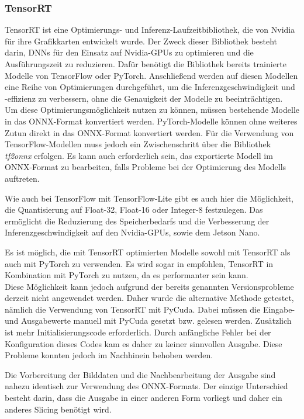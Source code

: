 \subsubsection{TensorRT} \label{cap:tensorrt}

TensorRT ist eine Optimierungs- und Inferenz-Laufzeitbibliothek, die von Nvidia für ihre Grafikkarten entwickelt wurde. Der Zweck dieser Bibliothek besteht darin, \ac{DNN}s für den Einsatz auf Nvidia-GPUs zu optimieren und die Ausführungszeit zu reduzieren. Dafür benötigt die Bibliothek bereits trainierte Modelle von TensorFlow oder PyTorch. Anschließend werden auf diesen Modellen eine Reihe von Optimierungen durchgeführt, um die Inferenzgeschwindigkeit und -effizienz zu verbessern, ohne die Genauigkeit der Modelle zu beeinträchtigen. \\
Um diese Optimierungsmöglichkeit nutzen zu können, müssen bestehende Modelle in das ONNX-Format konvertiert werden. PyTorch-Modelle können ohne weiteres Zutun direkt in das ONNX-Format konvertiert werden. Für die Verwendung von TensorFlow-Modellen muss jedoch ein Zwischenschritt über die Bibliothek \textit{tf2onnx} erfolgen. Es kann auch erforderlich sein, das exportierte Modell im ONNX-Format zu bearbeiten, falls Probleme bei der Optimierung des Modells auftreten.
\cite{Tensorrt_2023_nvidia}

Wie auch bei TensorFlow mit TensorFlow-Lite gibt es auch hier die Möglichkeit, die Quantisierung auf Float-32, Float-16 oder Integer-8 festzulegen. Das ermöglicht die Reduzierung des Speicherbedarfs und die Verbesserung der Inferenzgeschwindigkeit auf den Nvidia-\ac{GPU}s, sowie dem Jetson Nano.

Es ist möglich, die mit TensorRT optimierten Modelle sowohl mit TensorRT als auch mit PyTorch zu verwenden. Es wird sogar in \cite{mu_tensorrt} empfohlen, TensorRT in Kombination mit PyTorch zu nutzen, da es performanter sein kann.
\\
Diese Möglichkeit kann jedoch aufgrund der bereits genannten Versionsprobleme derzeit nicht angewendet werden.
Daher wurde die alternative Methode getestet, nämlich die Verwendung von TensorRT mit PyCuda. Dabei müssen die Eingabe- und Ausgabewerte manuell mit PyCuda gesetzt bzw. gelesen werden. Zusätzlich ist mehr Initialisierungscode erforderlich. Durch anfängliche Fehler bei der Konfiguration dieses Codes kam es daher zu keiner sinnvollen Ausgabe. Diese Probleme konnten jedoch im Nachhinein behoben werden.

Die Vorbereitung der Bilddaten und die Nachbearbeitung der Ausgabe sind nahezu identisch zur Verwendung des ONNX-Formats. Der einzige Unterschied besteht darin, dass die Ausgabe in einer anderen Form vorliegt und daher ein anderes Slicing benötigt wird.


